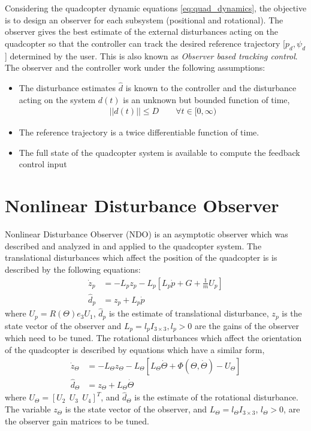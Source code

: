 \documentclass[letterpaper%
, twoside%
, 12pt%
,memoire%
, english%
,creativecommons,hyperref%
]{thETS}
\begin{document}
Considering the quadcopter dynamic equations \eqref{eq:quad_dynamics}, the objective is to design an observer for each subsystem (positional and rotational). The observer gives the best estimate of the external disturbances acting on the quadcopter so that the controller can track the desired reference trajectory [$p_d,\psi_d$] determined by the user. This is also known as \textit{Observer based tracking control}. The observer and the controller work under the following assumptions:
\begin{itemize}
\item The disturbance estimates $\hat{d}$ is known to the controller and the disturbance acting on the system $d(t)$ is an unknown but bounded function of time,
\begin{align}
||d(t)|| \leq D \quad \quad \forall t\in[0,\infty)
\end{align}
\item The reference trajectory is a twice differentiable function of time.
\item The full state of the quadcopter system is available to compute the feedback control input
\end{itemize}

\section{Nonlinear Disturbance Observer} \label{Sec:NDO}
Nonlinear Disturbance Observer (NDO) is an asymptotic observer which was described and analyzed in \citep{bash2019analysis} and applied to the quadcopter system. The translational disturbances which affect the position of the quadcopter is is described by the following equations: 
\begin{equation}
\begin{split}
\label{eqn:NDO1}
\dot{z}_p &= -L_pz_p - L_p[L_p\dot{p}+G+\frac{1}{m}U_p ]\\
\hat{d}_p&=z_p + L_p\dot{p}
\end{split}
\end{equation}
where $U_p=R(\Theta) e_3 U_1$, $\widehat{d}_p$ is the estimate of translational disturbance,  $z_p$ is the state vector of the observer and $L_p=l_p I_{3 \times 3}, l_p >0$ are the gains of the observer which need to be tuned. 
The rotational disturbances which affect the orientation of the quadcopter is described by equations which have a similar form, 
\begin{equation}
\begin{split}
\label{eqn:NDO2}
\dot{z}_\Theta &= -L_\Theta z_\Theta - L_\Theta[L_\Theta\dot{\Theta}+\Phi(\Theta,\dot{\Theta}) - U_\Theta] \\
\hat{d}_\Theta&=z_\Theta + L_\Theta\dot{\Theta}
\end{split}
\end{equation}
where $U_\Theta=[U_2\ \ U_3\ \ U_4]^T$, and $\widehat{d}_\Theta$ is the estimate of the rotational disturbance. The variable $z_\Theta$ is the state vector of the observer, and $L_\Theta=l_\Theta I_{3 \times 3}$,  $l_\Theta >0$, are the observer gain matrices to be tuned.
\end{document}
